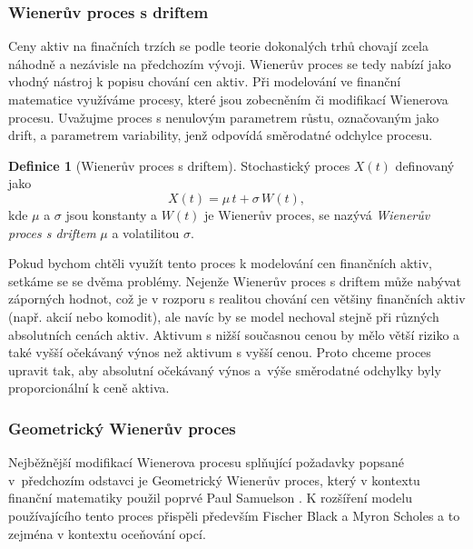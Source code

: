 \documentclass[a4paper,12pt]{report}
\theoremstyle{definition} \newtheorem{definice}[veta]{Definice}
\theoremstyle{remark}
\begin{document}
\subsubsection{Wienerův proces s driftem}
Ceny aktiv na finačních trzích se podle teorie dokonalých trhů chovají zcela náhodně a nezávisle na předchozím vývoji.
Wienerův proces se tedy nabízí jako vhodný nástroj k popisu chování cen aktiv.
Při modelování ve finanční matematice využíváme procesy, které jsou zobecněním či modifikací Wienerova procesu. 
Uvažujme proces s nenulovým parametrem růstu, označovaným jako drift, a parametrem variability, jenž odpovídá směrodatné odchylce procesu.
\begin{definice}[Wienerův proces s driftem]\label{Wieneruv_proces_s_driftem}
Stochastický proces $X(t)$ definovaný jako
$$X(t)  = \mu\, t + \sigma\, W (t),$$
kde $\mu$ a $\sigma$ jsou konstanty a $W (t)$ je Wienerův proces,
se nazývá \textit{Wienerův proces  s driftem} $\mu$ a volatilitou $\sigma$.
\end{definice}
Pokud bychom chtěli využít tento proces k modelování cen finančních aktiv, setkáme se se dvěma problémy.
Nejenže Wienerův proces s driftem může nabývat záporných hodnot, což je v rozporu s realitou chování cen většiny finančních aktiv (např. akcií nebo komodit), ale navíc by se model nechoval stejně při různých absolutních cenách aktiv. 
Aktivum s nižší současnou cenou by mělo větší riziko a také vyšší očekávaný výnos než aktivum s vyšší cenou.
Proto chceme proces upravit tak, aby absolutní očekávaný výnos a~výše směrodatné odchylky byly proporcionální k ceně aktiva. 

\subsubsection{Geometrický Wienerův proces}
Nejběžnější modifikací Wienerova procesu splňující požadavky popsané v~předchozím odstavci je Geometrický Wienerův proces, který v kontextu finanční matematiky použil poprvé Paul Samuelson \cite{samuelson1964rational}.
K rozšíření modelu používajícího tento proces přispěli především Fischer Black a Myron Scholes \cite{black1973pricing} a to zejména v kontextu oceňování opcí.
\end{document}
